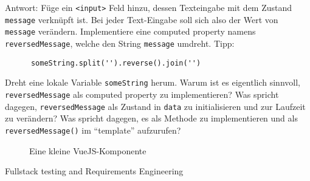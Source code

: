 \documentclass[addpoints]{exam}
\begin{document}
\begin{questions}
\begin{parts}
\begin{subparts}
    Antwort: \fillin
    \subpart[2]
    Füge ein \texttt{<input>} Feld hinzu, dessen Texteingabe mit dem Zustand
    \texttt{message} verknüpft ist. Bei jeder Text-Eingabe soll sich also der
    Wert von \texttt{message} verändern.
    \subpart[2]
    Implementiere eine computed property namens \texttt{reversedMessage}, welche
    den String \texttt{message} umdreht. Tipp:
    \begin{lstlisting}
      someString.split('').reverse().join('')
    \end{lstlisting}
    Dreht eine lokale Variable \texttt{someString} herum.
    \subpart[1]
    Warum ist es eigentlich sinnvoll, \texttt{reversedMessage} als computed
    property zu implementieren?
    \fillwithdottedlines{4em}
    \subpart[1]
    Was spricht dagegen, \texttt{reversedMessage} als Zustand in \texttt{data}
    zu initialisieren und zur Laufzeit zu verändern?
    \fillwithdottedlines{4em}
    \subpart[1]
    Was spricht dagegen, es als Methode zu implementieren und als
    \texttt{reversedMessage()} im ``template'' aufzurufen?
    \fillwithdottedlines{4em}
  \end{subparts}
\begin{figure}[h]
  \centering
  
  \caption{Eine kleine VueJS-Komponente}
  \label{fig:vue-example}
\end{figure}
\end{parts}

\clearpage

\question Fullstack testing and Requirements Engineering
\end{questions}
\end{document}
